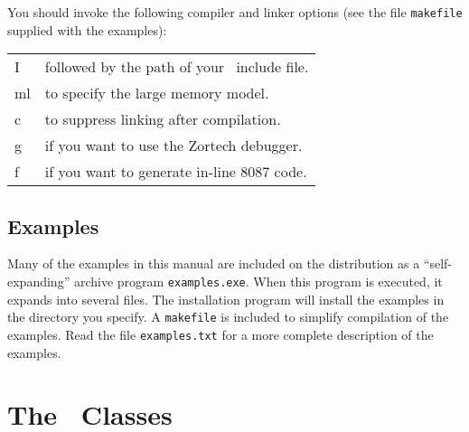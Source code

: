 \documentclass{admbmanual}
\makeatletter
\newenvironment{commandtable}
  {
    \par
    \begin{tabular}%
      {@{\vrule height 12pt depth7pt width0pt}@{\tt-}l @{\rm\quad} l}
  }
  {
    \end{tabular}
    \medskip
   }
\makeatother
\begin{document}
You should invoke the following compiler and linker options (see the file
\texttt{makefile} supplied with the examples):

\begin{commandtable}
 I  &  followed by the path of your \scAD\ include file.\\
 ml  &  to specify the large memory model.\\
 c  &  to suppress linking after compilation.\\
 g  &  if you want to use the Zortech debugger.\\
 f  &  if you want to generate in-line 8087 code.\\
\end{commandtable}

\section{Examples}

Many of the examples in this manual are included on the distribution
as a ``self-expanding'' archive program \texttt{examples.exe}. When this program
is executed, it expands into several files. The installation program will
install the examples in the directory you specify. A \texttt{makefile} is
included to simplify compilation of the examples. Read the file
\texttt{examples.txt} for a more complete description of the examples.


\chapter{The \scAD\ Classes}

\end{document}
